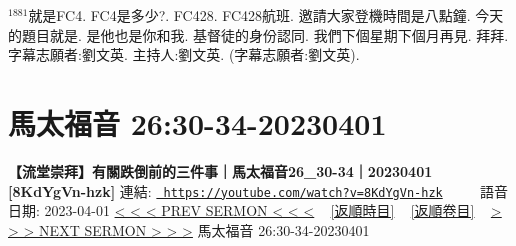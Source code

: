 \documentclass{book}
\begin{document}
$^{1881}$就是FC4.
FC4是多少?.
FC428.
FC428航班.
邀請大家登機時間是八點鐘.
今天的題目就是.
是他也是你和我.
基督徒的身份認同.
我們下個星期下個月再見.
拜拜.
字幕志願者:劉文英.
主持人:劉文英.
(字幕志願者:劉文英).
\newpage



\section{馬太福音 26:30-34-20230401}
\label{sec:8KdYgVn_hzk}
\textbf{【流堂崇拜】有關跌倒前的三件事｜馬太福音26\_30-34｜20230401 [8KdYgVn-hzk]}
\newline
\newline
連結: \href{https://youtube.com/watch?v=8KdYgVn-hzk}{\texttt{ https://youtube.com/watch?v=8KdYgVn-hzk}} ~~~~ 語音日期: 2023-04-01 
\newline
\newline
\hyperref[sec:7ZGXT0f30Z0]{\small{< < < PREV SERMON < < <}}
~
\hyperref[sec:index_chronic]{\small{[返順時目]}}
~
\hyperref[sec:index_scriptual]{\small{[返順卷目]}}
~
\hyperref[sec:v4hE6GM4QsI]{\small{> > > NEXT SERMON > > >}}
\newline
\newline
馬太福音 26:30-34-20230401
\newline
\end{document}
